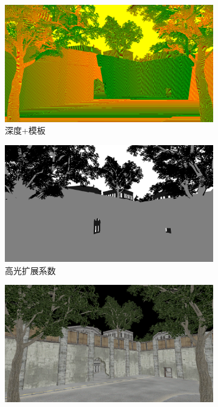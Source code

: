 \begin{figure}
\begin{fullwidth}
	\begin{subfigure}[b]{0.24\thewidth}
		\includegraphics[width=1.\textwidth]{figures/shade/g-buffer-depth}
		\caption{深度+模板}
	\end{subfigure}
	\begin{subfigure}[b]{0.24\thewidth}
		\includegraphics[width=1.\textwidth]{figures/shade/g-buffer-spec}
		\caption{高光扩展系数}
	\end{subfigure}
	\begin{subfigure}[b]{0.24\thewidth}
		\includegraphics[width=1.\textwidth]{figures/shade/g-buffer-diffuse}

\end{subfigure}
\end{fullwidth}
\end{figure}
